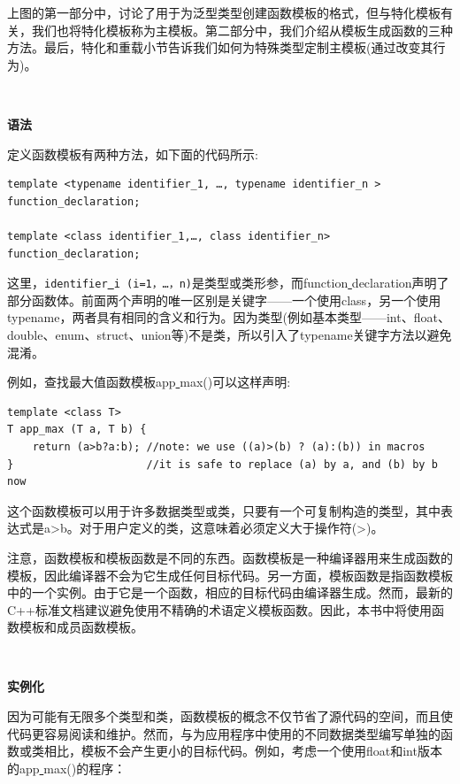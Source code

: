 上图的第一部分中，讨论了用于为泛型类型创建函数模板的格式，但与特化模板有关，我们也将特化模板称为主模板。第二部分中，我们介绍从模板生成函数的三种方法。最后，特化和重载小节告诉我们如何为特殊类型定制主模板(通过改变其行为)。 \par

\noindent\textbf{}\ \par
\textbf{语法} \ \par
定义函数模板有两种方法，如下面的代码所示: \par

\begin{lstlisting}[caption={}]
template <typename identifier_1, …, typename identifier_n >
function_declaration;

template <class identifier_1,…, class identifier_n>
function_declaration;
\end{lstlisting}

这里，\texttt{identifier\underline{ }i (i=1，…，n)}是类型或类形参，而function\underline{ }declaration声明了部分函数体。前面两个声明的唯一区别是关键字——一个使用class，另一个使用typename，两者具有相同的含义和行为。因为类型(例如基本类型——int、float、double、enum、struct、union等)不是类，所以引入了typename关键字方法以避免混淆。 \par
例如，查找最大值函数模板app\underline{ }max()可以这样声明: \par

\begin{lstlisting}[caption={}]
template <class T>
T app_max (T a, T b) {
	return (a>b?a:b); //note: we use ((a)>(b) ? (a):(b)) in macros
}                     //it is safe to replace (a) by a, and (b) by b now
\end{lstlisting}

这个函数模板可以用于许多数据类型或类，只要有一个可复制构造的类型，其中表达式是a>b。对于用户定义的类，这意味着必须定义大于操作符(>)。 \par
注意，函数模板和模板函数是不同的东西。函数模板是一种编译器用来生成函数的模板，因此编译器不会为它生成任何目标代码。另一方面，模板函数是指函数模板中的一个实例。由于它是一个函数，相应的目标代码由编译器生成。然而，最新的C++标准文档建议避免使用不精确的术语定义模板函数。因此，本书中将使用函数模板和成员函数模板。 \par

\noindent\textbf{}\ \par
\textbf{实例化} \ \par
因为可能有无限多个类型和类，函数模板的概念不仅节省了源代码的空间，而且使代码更容易阅读和维护。然而，与为应用程序中使用的不同数据类型编写单独的函数或类相比，模板不会产生更小的目标代码。例如，考虑一个使用float和int版本的app\underline{ }max()的程序： \par

